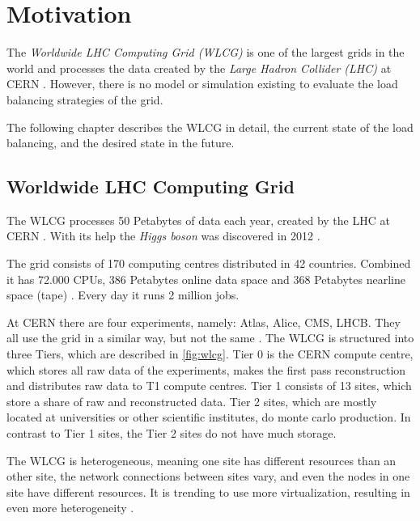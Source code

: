 
\chapter{Motivation}
The \textit{Worldwide LHC Computing Grid (WLCG)} is one of the largest grids in the world and processes the data created by the \textit{Large Hadron Collider (LHC)} at CERN \cite{wlcg_update}. However, there is no model or simulation existing to evaluate the load balancing strategies of the grid.

The following chapter describes the WLCG in detail, the current state of the load balancing, and the desired state in the future.

\section{Worldwide LHC Computing Grid}

The WLCG processes 50 Petabytes of data each year, created by the LHC at CERN \cite{data_process}. 
With its help the \textit{Higgs boson} was discovered in 2012 \cite{wlcg_online}.

The grid consists of 170 computing centres distributed in 42 countries. Combined it has 72.000 CPUs, 386 Petabytes online data space and 368 Petabytes nearline space (tape) \cite{wlcg_data}. Every day it runs 2 million jobs.

At CERN there are four experiments, namely: Atlas, Alice, CMS, LHCB. They all use the grid in a similar way, but not the same \cite{wlcg_computing}. The WLCG is structured into three Tiers, which are described in \ref{fig:wlcg}. Tier 0 is the CERN compute centre, which stores all raw data of the experiments, makes the first pass reconstruction and distributes raw data to T1 compute centres. Tier 1 consists of 13 sites, which store a share of raw and reconstructed data. Tier 2 sites, which are mostly located at universities or other scientific institutes, do monte carlo production. In contrast to Tier 1 sites, the Tier 2 sites do not have much storage.

The WLCG is heterogeneous, meaning one site has different resources than an other site, the network connections between sites vary, and even the nodes in one site have different resources. It is trending to use more virtualization, resulting in even more heterogeneity \cite{wlcg_update}.

